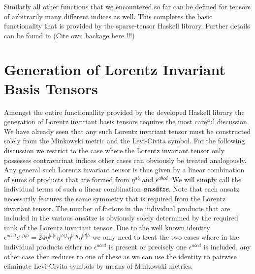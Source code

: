 \documentclass[a4paper,12pt, DIV=14, BCOR=5mm, twoside, headsepline]{scrbook}
\begin{document}
Similarly all other functions that we encountered so far can be defined for tensors of arbitrarily many different indices as well.
This completes the basic functionality that is provided by the sparse-tensor Haskell library. Further details can be found in (Cite own hackage here !!!)
\section{Generation of Lorentz Invariant Basis Tensors}\label{LorentzGen}
Amongst the entire functionallity provided by the developed Haskell library the generation of Lorentz invariant basis tensors requires the most careful discussion. We have already seen that any such Lorentz invariant tensor must be constructed solely from the Minkowski metric and the Levi-Civita symbol. For the following discussion we restrict to the case where the Lorentz invariant tensor only possesses contravarinat indices other cases can obviously be treated analogously. Any general such Lorentz invariant tensor is thus given by a linear combination of sums of products that are formed from $\eta^{ab}$ and $\epsilon^{abcd}$.
We will simply call the individual terms of such a linear combination \textit{\textbf{ansätze}}. Note that each ansatz necessarily features the same symmetry that is required from the Lorentz invariant tensor. The number of factors in the individual products that are included in the various ansätze is obviously solely determined by the required rank of the Lorentz invariant tensor.
Due to the well known identity $\epsilon^{abcd}\epsilon^{efgh} = 24 \eta^{[a\vert e}\eta^{\vert b \vert f}\eta^{\vert c \vert g}\eta^{\vert d] h}$ we only need to treat the two cases where in the individual products either no $\epsilon^{abcd}$ is present or precisely one $\epsilon^{abcd}$ is included, any other case then reduces to one of these as we can use the identity to pairwise eliminate Levi-Civita symbols by means of Minkowski metrics. 
\end{document}
